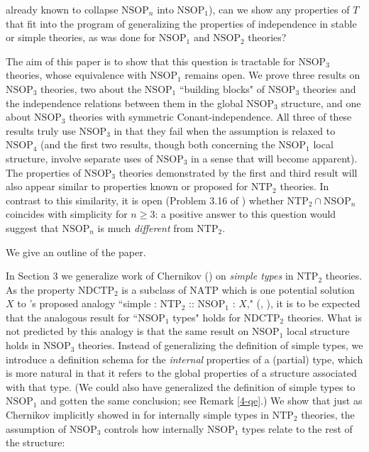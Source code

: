 \documentclass[12pt]{amsart}
\theoremstyle{definition}
\begin{document}
already known to collapse $\mathrm{NSOP}_n$ into $\mathrm{NSOP}_1$), can we show any properties of $T$ that fit into the program of generalizing the properties of independence in stable or simple theories, as was done for $\mathrm{NSOP}_{1}$ and $\mathrm{NSOP}_{2}$ theories?

The aim of this paper is to show that this question is tractable for $\mathrm{NSOP}_3$ theories, whose equivalence with $\mathrm{NSOP}_1$ remains open. We prove three results on $\mathrm{NSOP}_3$ theories, two about the $\mathrm{NSOP}_1$ ``building blocks" of $\mathrm{NSOP}_3$ theories and the independence relations between them in the global $\mathrm{NSOP}_3$ structure, and one about $\mathrm{NSOP}_3$ theories with symmetric Conant-independence. All three of these results truly use $\mathrm{NSOP}_3$ in that they fail when the assumption is relaxed to $\mathrm{NSOP}_4$ (and the first two results, though both concerning the $\mathrm{NSOP}_1$ local structure, involve separate uses of $\mathrm{NSOP}_3$ in a sense that will become apparent). The properties of $\mathrm{NSOP}_{3}$ theories demonstrated by the first and third result will also appear similar to properties known or proposed for $\mathrm{NTP}_2$ theories. In contrast to this similarity, it is open (Problem 3.16 of \cite{Che14}) whether $\mathrm{NTP}_{2} \cap \mathrm{NSOP}_n$ coincides with simplicity for $n \geq 3$: a positive answer to this question would suggest that $\mathrm{NSOP}_n$ is much \textit{different} from $\mathrm{NTP}_2$.

We give an outline of the paper.

In Section 3 we generalize work of Chernikov (\cite{Che14}) on \textit{simple types} in $\mathrm{NTP}_{2}$ theories. As the property $\mathrm{NDCTP}_{2}$ is a subclass of $\mathrm{NATP}$ which is one potential solution $X$ to \cite{Kr}'s proposed analogy ``simple : $\mathrm{NTP}_{2}$ :: $\mathrm{NSOP}_{1}$ : $X$," (\cite{NSOP2}, \cite{KL22}), it is to be expected that the analogous result for ``$\mathrm{NSOP}_{1}$ types" holds for $\mathrm{NDCTP}_{2}$ theories. What is not predicted by this analogy is that the same result on $\mathrm{NSOP}_1$ local structure holds in $\mathrm{NSOP}_3$ theories. Instead of generalizing the definition of simple types, we introduce a definition schema for the \textit{internal} properties of a (partial) type, which is more natural in that it refers to the global properties of a structure associated with that type. (We could also have generalized the definition of simple types to $\mathrm{NSOP}_{1}$ and gotten the same conclusion; see Remark \ref{4-qe}.) We show that just as Chernikov implicitly showed in \cite{Che14} for internally simple types in $\mathrm{NTP}_{2}$ theories, the assumption of $\mathrm{NSOP}_{3}$ controls how internally $\mathrm{NSOP}_{1}$ types relate to the rest of the structure:
\end{document}
